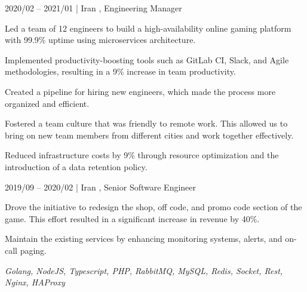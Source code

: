     \begin{twocolentry}{2020/02 -- 2021/01 | Iran}
        ,
        Engineering Manager
    \end{twocolentry}
    \begin{onecolentry}
        \begin{highlights}
            \item Led a team of 12 engineers to build a high-availability online gaming platform with 99.9\% uptime using microservices architecture.
            \item Implemented productivity-boosting tools such as GitLab CI, Slack, and Agile methodologies, resulting in a 9\% increase in team productivity.
            \item Created a pipeline for hiring new engineers, which made the process more organized and efficient.
            \item Fostered a team culture that was friendly to remote work. This allowed us to bring on new team members from different cities and work together effectively.
            \item Reduced infrastructure costs by 9\% through resource optimization and the introduction of a data retention policy.
        \end{highlights}
    \end{onecolentry}
    \begin{twocolentry}{2019/09 -- 2020/02 | Iran}
        ,
        Senior Software Engineer
    \end{twocolentry}
    \begin{onecolentry}
        \begin{highlights}
            \item Drove the initiative to redesign the shop, off code, and promo code section of the game. This effort resulted in a significant increase in revenue by 40\%.
            \item Maintain the existing services by enhancing monitoring systems, alerts, and on-call paging.
        \end{highlights}
        \textit{Golang, NodeJS, Typescript, PHP, RabbitMQ, MySQL, Redis, Socket, Rest, Nginx, HAProxy}
    \end{onecolentry}
    \vspace{0.3cm}


